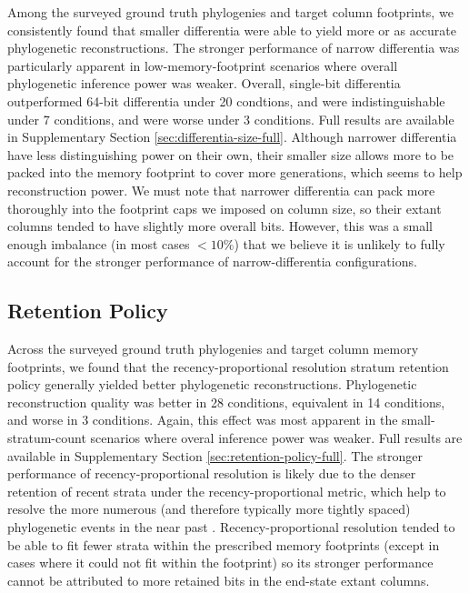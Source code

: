 Among the surveyed ground truth phylogenies and target column footprints, we consistently found that smaller differentia were able to yield more or as accurate phylogenetic reconstructions.
The stronger performance of narrow differentia was particularly apparent in low-memory-footprint scenarios where overall phylogenetic inference power was weaker.
Overall, single-bit differentia outperformed 64-bit differentia under 20 condtions, and were indistinguishable under 7 conditions, and were worse under 3 conditions.
Full results are available in Supplementary Section \ref{sec:differentia-size-full}.
Although narrower differentia have less distinguishing power on their own, their smaller size allows more to be packed into the memory footprint to cover more generations, which seems to help reconstruction power.
We must note that narrower differentia can pack more thoroughly into the footprint caps we imposed on column size, so their extant columns tended to have slightly more overall bits.
However, this was a small enough imbalance (in most cases $<10\%$) that we believe it is unlikely to fully account for the stronger performance of narrow-differentia configurations.

\subsection{Retention Policy}

Across the surveyed ground truth phylogenies and target column memory footprints, we found that the recency-proportional resolution stratum retention policy generally yielded better phylogenetic reconstructions.
Phylogenetic reconstruction quality was better in 28 conditions, equivalent in 14 conditions, and worse in 3 conditions.
Again, this effect was most apparent in the small-stratum-count scenarios where overal inference power was weaker.
Full results are available in Supplementary Section \ref{sec:retention-policy-full}.
The stronger performance of recency-proportional resolution is likely due to the denser retention of recent strata under the recency-proportional metric, which help to resolve the more numerous (and therefore typically more tightly spaced) phylogenetic events in the near past \citep{zhaxybayeva2004cladogenesis}.
Recency-proportional resolution tended to be able to fit fewer strata within the prescribed memory footprints (except in cases where it could not fit within the footprint) so its stronger performance cannot be attributed to more retained bits in the end-state extant columns.
